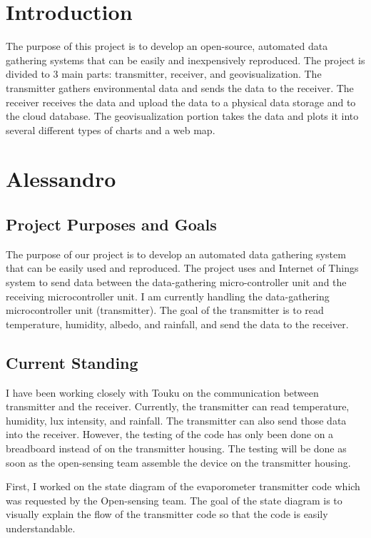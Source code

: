\documentclass[onecolumn, draftclsnofoot,10pt, compsoc]{IEEEtran}
\begin{document}
\newpage
{}
\tableofcontents
\clearpage

\section{Introduction}
The purpose of this project is to develop an open-source, automated data gathering systems that can be easily and inexpensively reproduced. The project is divided to 3 main parts: transmitter, receiver, and geovisualization. The transmitter gathers environmental data and sends the data to the receiver. The receiver receives the data and upload the data to a physical data storage and to the cloud database. The geovisualization portion takes the data and plots it into several different types of charts and a web map.


\section{Alessandro}
\subsection{Project Purposes and Goals}
The purpose of our project is to develop an automated data gathering system that can be easily used and reproduced. The project uses and Internet of Things system to send data between the data-gathering micro-controller unit and the receiving microcontroller unit. I am currently handling the data-gathering microcontroller unit (transmitter). The goal of the transmitter is to read temperature, humidity, albedo, and rainfall, and send the data to the receiver. 

\subsection{Current Standing}
I have been working closely with Touku on the communication between transmitter and the receiver. Currently, the transmitter can read temperature, humidity, lux intensity, and rainfall. The transmitter can also send those data into the receiver. However, the testing of the code has only been done on a breadboard instead of on the transmitter housing. The testing will be done as soon as the open-sensing team assemble the device on the transmitter housing.


First, I worked on the state diagram of the evaporometer transmitter code which was requested by the Open-sensing team. The goal of the state diagram is to visually explain the flow of the transmitter code so that the code is easily understandable.
\end{document}
